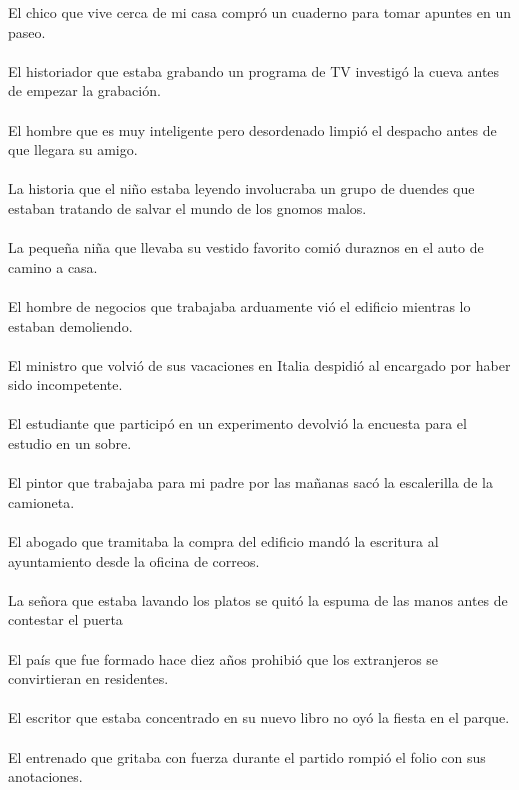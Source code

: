 El chico que vive cerca de mi casa compr\'{o} un cuaderno para tomar apuntes en un paseo.	\\	\\
El historiador que estaba grabando un programa de TV investig\'{o} la cueva antes de empezar la grabaci\'{o}n.	\\	\\
El hombre que es muy inteligente pero desordenado limpi\'{o} el despacho antes de que llegara su amigo.	\\	\\
La historia que el ni\~{n}o estaba leyendo involucraba un grupo de duendes que estaban tratando de salvar el mundo de los gnomos malos.	\\	\\
La peque\~{n}a ni\~{n}a que llevaba su vestido favorito comi\'{o} duraznos en el auto de camino a casa.	\\	\\
El hombre de negocios que trabajaba arduamente vi\'{o} el edificio mientras lo estaban demoliendo.	\\	\\
El ministro que volvi\'{o} de sus vacaciones en Italia despidi\'{o} al encargado por haber sido incompetente.	\\	\\
El estudiante que particip\'{o} en un experimento devolvi\'{o} la encuesta para el estudio en un sobre.	\\	\\
El pintor que trabajaba para mi padre por las ma\~{n}anas sac\'{o} la escalerilla de la camioneta.	\\	\\
El abogado que tramitaba la compra del edificio mand\'{o} la escritura al ayuntamiento desde la oficina de correos.	\\	\\
La se\~{n}ora que estaba lavando los platos se quit\'{o} la espuma de las manos antes de contestar el puerta	\\	\\
El pa\'{i}s que fue formado hace diez a\~{n}os prohibi\'{o} que los extranjeros se convirtieran en residentes.	\\	\\
El escritor que estaba concentrado en su nuevo libro no oy\'{o} la fiesta en el parque.	\\	\\
El entrenado que gritaba con fuerza durante el partido rompi\'{o} el folio con sus anotaciones.	\\	\\
